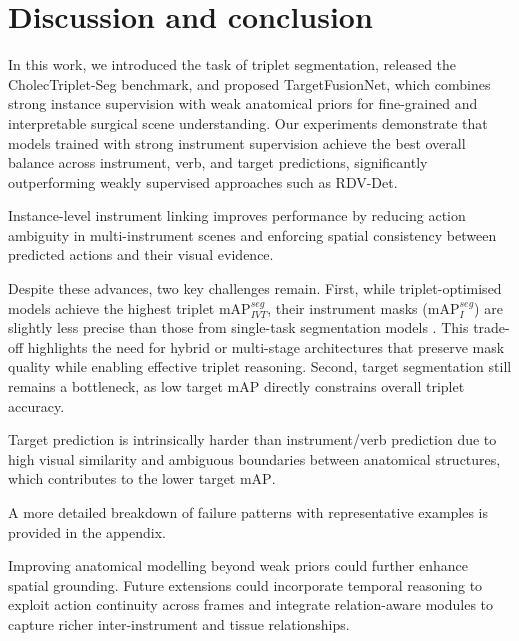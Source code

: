 \documentclass[pdflatex,sn-mathphys-num]{sn-jnl}%
\newcommand{\mAP}{\textrm{mAP}}
\newcommand{\revref}[2]{%
  \marginpar{\raggedright$\scriptstyle R_{#1}C_{#2}$}%
}
\DeclareRobustCommand{\robustrevref}[2]{%
\revref{#1}{#2}
}
\newcommand{\revnew}[1]{%
{\color{orange}#1}\xspace
}
\newcommand{\revref}[2]{\ignorespaces}
\newcommand{\robustrevref}[2]{\ignorespaces}
\newcommand{\revnew}[1]{#1\xspace}
\theoremstyle{thmstyleone}%
\theoremstyle{thmstyletwo}%
\theoremstyle{thmstylethree}%
\begin{document}
\section{Discussion and conclusion}
%
In this work, we introduced the task of triplet segmentation, released the CholecTriplet-Seg benchmark, and proposed TargetFusionNet, which combines strong instance supervision with weak anatomical priors for fine-grained and interpretable surgical scene understanding.
%
Our experiments demonstrate that models trained with strong instrument supervision achieve the best overall balance across instrument, verb, and target predictions, significantly outperforming weakly supervised approaches such as RDV-Det.
\robustrevref{6}{3}\revnew{Instance-level instrument linking improves performance by reducing action ambiguity in multi-instrument scenes and enforcing spatial consistency between predicted actions and their visual evidence.}
%
Despite these advances, two key challenges remain.
First, while triplet-optimised models achieve the highest triplet $\mAP_{IVT}^{seg}$, their instrument masks ($\mAP_{I}^{seg}$) are slightly less precise than those from single-task segmentation models \cite{alabi2025cholecinstanceseg}.
This trade-off highlights the need for hybrid or multi-stage architectures that preserve mask quality while enabling effective triplet reasoning.
Second, target segmentation still remains a bottleneck, as low target $\mAP$ directly constrains overall triplet accuracy. \robustrevref{4}{1}\revnew{Target prediction is intrinsically harder than instrument/verb prediction due to high visual similarity and ambiguous boundaries between anatomical structures, which contributes to the lower target $\mAP$.}
\robustrevref{4}{3}\revnew{A more detailed breakdown of failure patterns with  representative examples is provided in the appendix.
}
Improving anatomical modelling beyond weak priors could further enhance spatial grounding.
Future extensions could incorporate temporal reasoning to exploit action continuity across frames and integrate relation-aware modules to capture richer inter-instrument and tissue relationships.


\end{document}
